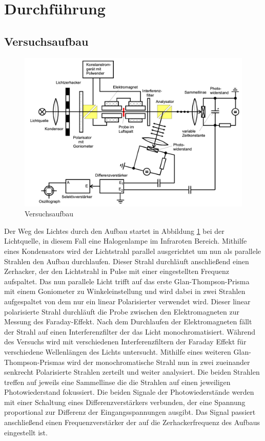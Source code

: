 \section{Durchführung}
\label{sec:Durchfuehrung}
\subsection{Versuchsaufbau}
\begin{figure}[ht]
    \centering
    \includegraphics[width = 0.75 \textwidth]{./bilder/Schematische_Darstellung_der_Messapparatur.png}
    \caption{Versuchsaufbau}
    \label{fig:aufbau}
\end{figure}
Der Weg des Lichtes durch den Aufbau startet in Abbildung \ref{fig:aufbau} bei der Lichtquelle, in diesem Fall eine Halogenlampe im Infraroten Bereich.
Mithilfe eines Kondensators wird der Lichtstrahl parallel ausgerichtet um nun als parallele Strahlen den Aufbau durchlaufen.
Dieser Strahl durchläuft anschließend einen Zerhacker, der den Lichtstrahl in Pulse mit einer eingestellten Frequenz aufspaltet.
Das nun parallele Licht trifft auf das erste Glan-Thompson-Prisma mit einem Goniometer zu Winkeleinstellung und wird dabei in zwei Strahlen aufgespaltet von dem nur ein linear Polarisierter verwendet wird.
Dieser linear polarisierte Strahl durchläuft die Probe zwischen den Elektromagneten zur Messung des Faraday-Effekt.
Nach dem Durchlaufen der Elektromagneten fällt der Strahl auf einen Interferenzfilter der das Licht monochromatisiert.
Während des Versuchs wird mit verschiedenen Interferenzfiltern der Faraday Effekt für verschiedene Wellenlängen des Lichts untersucht.
Mithilfe eines weiteren Glan-Thompson-Prismas wird der monochromatische Strahl nun in zwei zueinander senkrecht Polarisierte Strahlen zerteilt und weiter analysiert.
Die beiden Strahlen treffen auf jeweils eine Sammellinse die die Strahlen auf einen jeweiligen Photowiederstand fokussiert.
Die beiden Signale der Photowiederstände werden mit einer Schaltung eines Differenzverstärkers verbunden, der eine Spannung proportional zur Differenz der Eingangsspannungen ausgibt.
Das Signal passiert anschließend einen Frequenzverstärker der auf die Zerhackerfrequenz des Aufbaus eingestellt ist.
